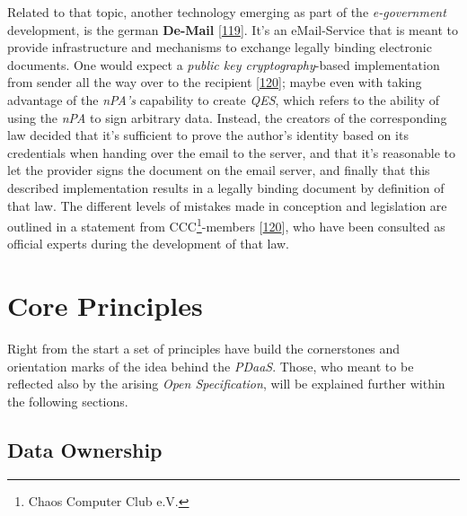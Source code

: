 \documentclass[12pt,english,a4paper,titlepage,cleardoublepage=empty,dottedtoc]{report}
\begin{document}
Related to that topic, another technology emerging as part of the
\emph{e-government} development, is the german \textbf{De-Mail}
{[}\protect\hyperlink{ref-web_2017_about-de-mail}{119}{]}. It's an
eMail-Service that is meant to provide infrastructure and mechanisms to
exchange legally binding electronic documents. One would expect a
\emph{public key cryptography}-based implementation from sender all the
way over to the recipient
{[}\protect\hyperlink{ref-statement_2013_de-mail}{120}{]}; maybe even
with taking advantage of the \emph{nPA's} capability to create
\emph{QES}, which refers to the ability of using the \emph{nPA} to sign
arbitrary data. Instead, the creators of the corresponding law decided
that it's sufficient to prove the author's identity based on its
credentials when handing over the email to the server, and that it's
reasonable to let the provider signs the document on the email server,
and finally that this described implementation results in a legally
binding document by definition of that law. The different levels of
mistakes made in conception and legislation are outlined in a statement
from CCC\footnote{Chaos Computer Club e.V.}-members
{[}\protect\hyperlink{ref-statement_2013_de-mail}{120}{]}, who have been
consulted as official experts during the development of that law.

\hypertarget{core-principles}{\chapter{Core
Principles}\label{core-principles}}

Right from the start a set of principles have build the cornerstones and
orientation marks of the idea behind the \emph{PDaaS}. Those, who meant
to be reflected also by the arising \emph{Open Specification}, will be
explained further within the following sections.

\section{Data Ownership}\label{data-ownership}
\end{document}

